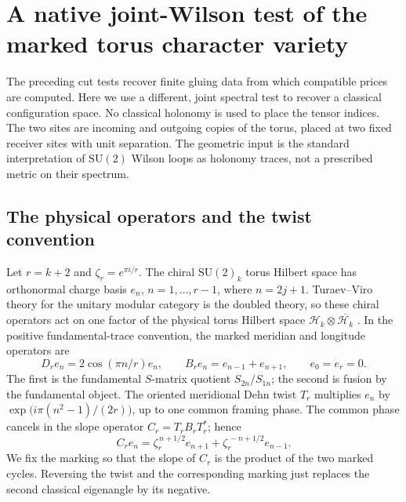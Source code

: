 \section{A native joint-Wilson test of the marked torus character variety}
\label{sec:torus-joint-wilson}

The preceding cut tests recover finite gluing data from which compatible
prices are computed.  Here we use a different, joint spectral test to
recover a classical configuration space.  No classical holonomy is used
to place the tensor indices. The two sites are incoming and outgoing copies of the torus,
placed at two fixed receiver sites with unit separation. The geometric input
is the standard interpretation of \(\mathrm{SU}(2)\) Wilson loops as
holonomy traces, not a prescribed metric on their spectrum.

\subsection{The physical operators and the twist convention}

Let \(r=k+2\) and \(\zeta_r=e^{\pi i/r}\).  The chiral
\(\mathrm{SU}(2)_k\) torus Hilbert space has orthonormal charge basis
\(e_n\), \(n=1,\ldots,r-1\), where \(n=2j+1\).
Turaev--Viro theory for the unitary modular category is the doubled
theory, so these chiral operators act on one factor of the physical
torus Hilbert space \(\mathcal H_k\otimes\overline{\mathcal H_k}\)
\cite{BalsamIII}.  In the positive fundamental-trace convention, the
marked meridian and longitude operators are
\begin{equation}
 D_r e_n=2\cos(\pi n/r)e_n,\qquad
 B_r e_n=e_{n-1}+e_{n+1},\qquad e_0=e_r=0.
 \label{eq:tw-torus-basic-operators}
\end{equation}
The first is the fundamental \(S\)-matrix quotient
\(S_{2n}/S_{1n}\); the second is fusion by the fundamental object.
The oriented meridional Dehn twist \(T_r\) multiplies \(e_n\) by
\(\exp\!\big(i\pi(n^2-1)/(2r)\big)\), up to one common framing phase.
The common phase cancels in the slope operator \(C_r=T_rB_rT_r^*\);
hence
\begin{equation}
 C_r e_n=\zeta_r^{\,n+1/2}e_{n+1}
          +\zeta_r^{\,-n+1/2}e_{n-1}.
 \label{eq:tw-torus-twist-operator}
\end{equation}
We fix the marking so that the slope of \(C_r\) is the product
of the two marked cycles.  Reversing the twist and the corresponding
marking just replaces the second classical eigenangle by its negative.

